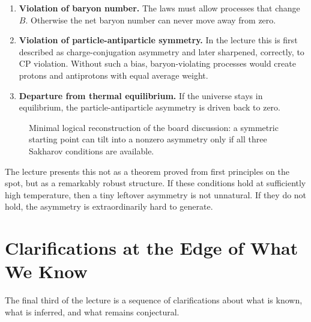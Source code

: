 \begin{enumerate}
\item \textbf{Violation of baryon number.} The laws must allow processes that change \(B\). Otherwise the net baryon number can never move away from zero.
\item \textbf{Violation of particle-antiparticle symmetry.} In the lecture this is first described as charge-conjugation asymmetry and later sharpened, correctly, to CP violation. Without such a bias, baryon-violating processes would create protons and antiprotons with equal average weight.
\item \textbf{Departure from thermal equilibrium.} If the universe stays in equilibrium, the particle-antiparticle asymmetry is driven back to zero.
\end{enumerate}

\begin{figure}[ht]
\centering
{}
\caption{Minimal logical reconstruction of the board discussion: a symmetric starting point can tilt into a nonzero asymmetry only if all three Sakharov conditions are available.}
\end{figure}

The lecture presents this not as a theorem proved from first principles on the spot, but as a remarkably robust structure. If these conditions hold at sufficiently high temperature, then a tiny leftover asymmetry is not unnatural. If they do not hold, the asymmetry is extraordinarily hard to generate.

\section{Clarifications at the Edge of What We Know}

The final third of the lecture is a sequence of clarifications about what is known, what is inferred, and what remains conjectural.

